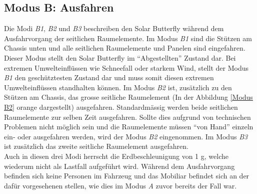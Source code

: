 \subsection{Modus B: Ausfahren}
Die Modi \emph{B1}, \emph{B2} und \emph{B3} beschreiben den Solar Butterfly während dem Ausfahrvorgang der seitlichen Raumelemente. Im Modus \emph{B1} sind die Stützen am Chassis unten und alle seitlichen Raumelemente und Panelen sind eingefahren. Dieser Modus stellt den Solar Butterfly im ``Abgestellten'' Zustand dar. Bei extremen Umwelteinflüssen wie Schneefall oder starkem Wind, stellt der Modus \emph{B1} den geschütztesten Zustand dar und muss somit diesen extremen Umwelteinflüssen standhalten können.
Im Modus \emph{B2} ist, zusätzlich zu den Stützen am Chassis, das grosse seitliche Raumelement (In der Abbildung \ref{Modus B2} orange dargestellt) ausgefahren. Standardmässig werden beide seitlichen Raumelemente zur selben Zeit ausgefahren. Sollte dies aufgrund von technischen Problemen nicht möglich sein und die Raumelemente müssen ``von Hand'' einzeln ein- oder ausgefahren werden, wird der Modus \emph{B2} eingenommen. Im Modus \emph{B3} ist zusätzlich das zweite seitliche Raumelement ausgefahren.\\
Auch in diesen drei Modi herrscht die Erdbeschleunigung von 1 g, welche wiederum nicht als Lastfall aufgeführt wird. Während dem Ausfahrvorgang befinden sich keine Personen im Fahrzeug und das Mobiliar befindet sich an der dafür vorgesehenen stellen, wie dies im Modus \emph{A} zuvor bereits der Fall war.

